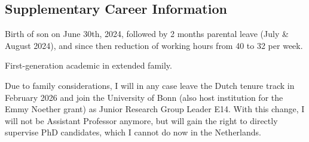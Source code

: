 \documentclass{scrartcl}
\begin{document}
\subsection*{Supplementary Career Information}
Birth of son on June 30th, 2024, followed by 2 months parental leave (July \& August 2024), and since then reduction of working hours from 40 to 32 per week.

First-generation academic in extended family.

Due to family considerations, I will in any case leave the Dutch tenure track in February 2026 and join the University of Bonn (also host institution for the Emmy Noether grant) as Junior Research Group Leader E14. With this change, I will not be Assistant Professor anymore, but will gain the right to directly supervise PhD candidates, which I cannot do now in the Netherlands.
\end{document}

